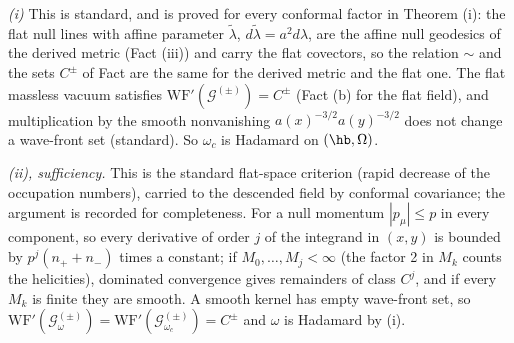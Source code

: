 \emph{(i)} This is standard, and is proved for every conformal factor in Theorem (i): the flat null lines with affine parameter $\tilde\lambda$, $d\tilde\lambda = a^{2}d\lambda$, are the affine null geodesics of the derived metric (Fact (iii)) and carry the flat covectors, so the relation $\sim$ and the sets $C^{\pm}$ of Fact  are the same for the derived metric and the flat one. The flat massless vacuum satisfies $\mathrm{WF}'(\mathcal{G}^{(\pm)}) = C^{\pm}$ (Fact (b) for the flat field), and multiplication by the smooth nonvanishing $a(x)^{-3/2}a(y)^{-3/2}$ does not change a wave-front set (standard). So $\omega_{c}$ is Hadamard on $(\hb, \Omega)$.

\emph{(ii), sufficiency.} This is the standard flat-space criterion (rapid decrease of the occupation numbers), carried to the descended field by conformal covariance; the argument is recorded for completeness. For a null momentum $|p_{\mu}| \le p$ in every component, so every derivative of order $j$ of the integrand in $(x, y)$ is bounded by $p^{j}(n_{+} + n_{-})$ times a constant; if $M_{0}, \dots, M_{j} < \infty$ (the factor 2 in $M_{k}$ counts the helicities), dominated convergence gives remainders of class $C^{j}$, and if every $M_{k}$ is finite they are smooth. A smooth kernel has empty wave-front set, so $\mathrm{WF}'(\mathcal{G}^{(\pm)}_{\omega}) = \mathrm{WF}'(\mathcal{G}^{(\pm)}_{\omega_{c}}) = C^{\pm}$ and $\omega$ is Hadamard by (i).

